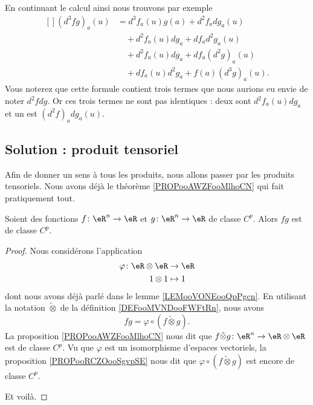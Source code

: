 En continuant le calcul ainsi nous trouvons par exemple
\begin{equation}
	\begin{aligned}[]
		(d^3fg)_a(u) & =d^3f_a(u)g(a)+d^2f_adg_a(u)          \\
		             & \quad +d^2f_a(u)dg_a+df_ad^2g_a(u)    \\
		             & \quad +d^2f_a(u)dg_a+df_a(d^2g)_a(u)  \\
		             & \quad +df_a(u)d^2g_a+f(a)(d^3g)_a(u).
	\end{aligned}
\end{equation}
Vous noterez que cette formule contient trois termes que nous aurions eu envie de noter \( d^2fdg\). Or ces trois termes ne sont pas identiques : deux sont \( d^2f_a(u)dg_a\) et un est \( (d^2f)_adg_a(u)\).

\subsection{Solution : produit tensoriel}

Afin de donner un sens à tous les produits, nous allons passer par les produits tensoriels. Nous avons déjà le théorème \ref{PROPooAWZFooMlhoCN} qui fait pratiquement tout.

\begin{proposition}      \label{PROPooWNCGooHbmcVb}
	Soient des fonctions \( f\colon \eR^n\to \eR\) et \( g\colon \eR^n\to \eR\) de classe \( C^p\). Alors \( fg\) est de classe \( C^p\).
\end{proposition}

\begin{proof}
	Nous considérons l'application
	\begin{equation}
		\begin{aligned}
			\varphi\colon \eR\otimes \eR & \to \eR   \\
			1\otimes 1                   & \mapsto 1
		\end{aligned}
	\end{equation}
	dont nous avons déjà parlé dans le lemme \ref{LEMooVONEooQpPgcn}. En utilisant la notation \( \tilde\otimes\) de la définition \ref{DEFooMVNDooFWFtRn}, nous avons
	\begin{equation}
		fg=\varphi\circ(f\tilde\otimes g).
	\end{equation}
	La proposition \ref{PROPooAWZFooMlhoCN} nous dit que \( f\tilde\otimes g\colon \eR^n\to \eR\otimes \eR\) est de classe \( C^p\). Vu que \( \varphi\) est un isomorphisme d'espaces vectoriels, la proposition \ref{PROPooRCZOooSgvpSE} nous dit que \( \varphi\circ(f\tilde\otimes g)\) est encore de classe \( C^p\).

	Et voilà.
\end{proof}

